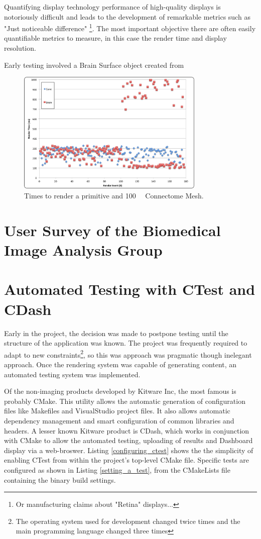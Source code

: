 \documentclass[MSc,paper=a4,pagesize=auto]{icldt}
\begin{document}
Quantifying display technology performance of high-quality displays is notoriously difficult and leads to the development of remarkable metrics such as "Just noticeable difference"\cite{Zhang2008} \footnote{Or manufacturing claims about "Retina" displays...}. The most important objective there are often easily quantifiable metrics to measure, in this case the render time and display resolution.

Early testing involved a Brain Surface object created from  


\begin{figure}[htbp!]
    \centering
    \includegraphics[width=0.8\textwidth]{resources/render_times}
    \caption{Times to render a primitive and \SI{100}{\mega\byte} Connectome Mesh.}
    \label{fig:render_times}
\end{figure}


\section{User Survey of the Biomedical Image Analysis Group}



\section{Automated Testing with CTest and CDash}
Early in the project, the decision was made to postpone testing until the structure of the application was known. The project was frequently required to adapt to new constraints\footnote{The operating system used for development changed twice times and the main programming language changed three times}, so this was approach was pragmatic though inelegant approach. Once the rendering system was capable of generating content, an automated testing system was implemented.

Of the non-imaging products developed by Kitware Inc, the most famous is probably CMake. This utility allows the automatic generation of configuration files like Makefiles and VisualStudio project files. It also allows automatic dependency management and smart configuration of common libraries and headers. A lesser known Kitware product is CDash, which works in conjunction with CMake to allow the automated testing, uploading of results and Dashboard display via a web-broswer. Listing \ref{configuring_ctest} shows the the simplicity of enabling CTest from within the project's top-level CMake file. Specific tests are configured as shown in Listing \ref{setting_a_test}, from the CMakeLists file containing the binary build settings.
\end{document}
